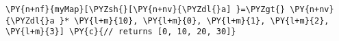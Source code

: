 \begin{Verbatim}[commandchars=\\\{\}]
\PY{n+nf}{myMap}[\PYZsh{}[\PY{n+nv}{\PYZdl{}a] }=\PYZgt{} \PY{n+nv}{\PYZdl{}a }* \PY{l+m}{10}, \PY{l+m}{0}, \PY{l+m}{1}, \PY{l+m}{2}, \PY{l+m}{3}] \PY{c}{// returns [0, 10, 20, 30]}
\end{Verbatim}
